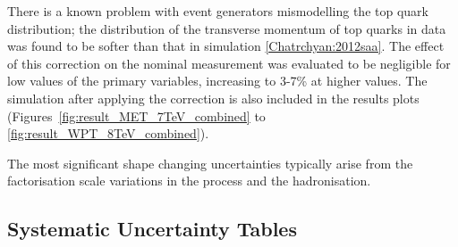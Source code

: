 There is a known problem with event generators mismodelling the top quark \pt distribution; the distribution
of the transverse momentum of top quarks in data was found to be softer than that in simulation
\ref{Chatrchyan:2012saa}. The effect of this correction on the nominal measurement was evaluated to be
negligible for low values of the primary variables, increasing to 3-7\% at higher values. The \MADGRAPH
simulation after applying the \tquark \pt correction is also included in the results plots
(Figures~\ref{fig:result_MET_7TeV_combined} to \ref{fig:result_WPT_8TeV_combined}).

The most significant shape changing uncertainties typically arise from the factorisation scale variations in
the \ttbar process and the hadronisation.

\subsection{Systematic Uncertainty Tables}
\label{ss:systematic_uncertainty_tables}


\begin{landscape}

\end{landscape}
\begin{landscape}

\end{landscape}




\begin{landscape}

\end{landscape}
\begin{landscape}

\end{landscape}



